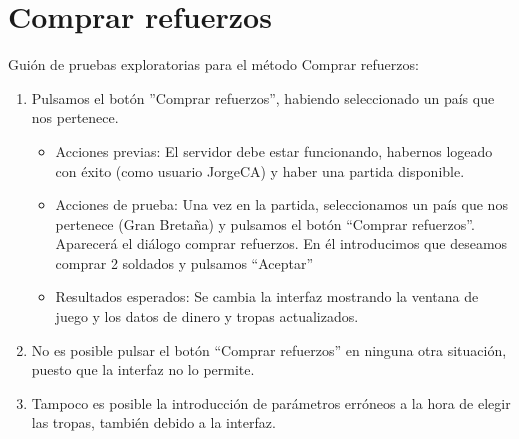 \section{Comprar refuerzos}

Guión de pruebas exploratorias para el método Comprar refuerzos:

\begin{enumerate}
\item Pulsamos el botón ''Comprar refuerzos'', habiendo seleccionado un país que nos pertenece.
	\begin{itemize}
	\item Acciones previas: El servidor debe estar funcionando, habernos logeado con éxito (como usuario JorgeCA) y haber una partida disponible.
	\item Acciones de prueba: Una vez en la  partida, seleccionamos un país que nos pertenece (Gran Bretaña) y pulsamos el botón ``Comprar refuerzos''.
Aparecerá el diálogo comprar refuerzos. En él introducimos que deseamos comprar 2 soldados y pulsamos ``Aceptar''
	\item Resultados esperados: Se cambia la interfaz mostrando la ventana de juego y los datos de dinero y tropas actualizados.
	\end{itemize}
\item No es posible pulsar el botón ``Comprar refuerzos'' en ninguna otra situación, puesto que la interfaz no lo permite.
\item Tampoco es posible la introducción de parámetros erróneos a la hora de elegir las tropas, también debido a la interfaz.

\end{enumerate}

